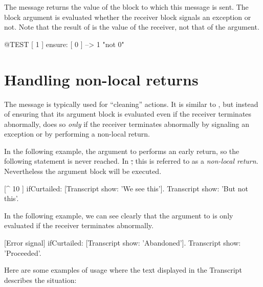\documentclass[a4paper,10pt,twoside]{book}
\begin{document}
The message  returns the value of the block to which this message is sent. The block argument is evaluated whether the receiver block signals an exception or not. Note that the result of  is the value of the receiver, not that of the argument.

\begin{code}{@TEST}
[ 1 ] ensure: [ 0 ] --> 1    "not 0"
\end{code}

\section{Handling non-local returns}

The message  is typically used for ``cleaning'' actions. It is similar to , but instead of ensuring that its argument block is evaluated even if the receiver terminates abnormally,  does so \emph{only} if the receiver terminates abnormally by signaling an exception or by performing a non-local return.

In the following example, the argument to  performs an early return, so the following statement is never reached.
In \st, this is referred to as a \emph{non-local return}.
Nevertheless the argument block will be executed.
\begin{code}{}
[^ 10 ] ifCurtailed: [Transcript show: 'We see this'].
Transcript show: 'But not this'.
\end{code}

In the following example, we can see clearly that the argument to  is only evaluated if the receiver terminates abnormally.
\begin{code}{}
[Error signal] ifCurtailed: [Transcript show: 'Abandoned'].
Transcript show: 'Proceeded'.
\end{code}


Here are some  examples of  usage where the text displayed in the Transcript describes the situation:
\end{document}

